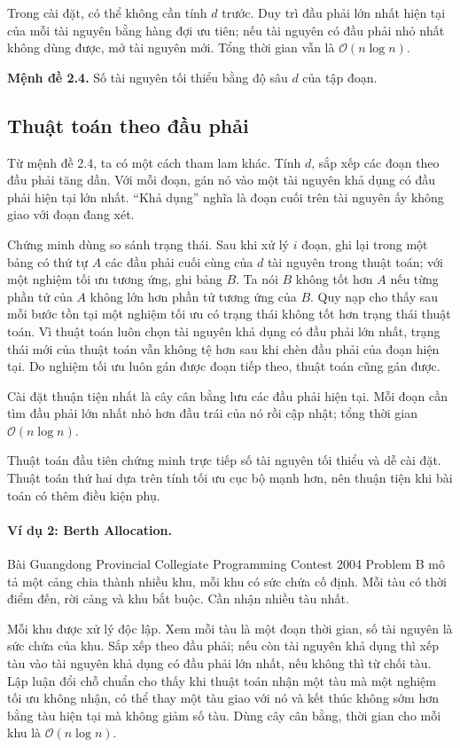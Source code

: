\documentclass[11pt]{article}
\newcommand{\Oh}{\mathcal{O}}
\newcommand{\depth}{d}
\begin{document}
Trong cài đặt, có thể không cần tính \(\depth\) trước. Duy trì đầu phải lớn
nhất hiện tại của mỗi tài nguyên bằng hàng đợi ưu tiên; nếu tài nguyên có đầu
phải nhỏ nhất không dùng được, mở tài nguyên mới. Tổng thời gian vẫn là
\(\Oh(n\log n)\).

\textbf{Mệnh đề 2.4.} Số tài nguyên tối thiểu bằng độ sâu \(\depth\) của tập
đoạn.

\subsection{Thuật toán theo đầu phải}

Từ mệnh đề 2.4, ta có một cách tham lam khác. Tính \(\depth\), sắp xếp các
đoạn theo đầu phải tăng dần. Với mỗi đoạn, gán nó vào một tài nguyên khả dụng
có đầu phải hiện tại lớn nhất. ``Khả dụng'' nghĩa là đoạn cuối trên tài nguyên
ấy không giao với đoạn đang xét.

Chứng minh dùng so sánh trạng thái. Sau khi xử lý \(i\) đoạn, ghi lại trong
một bảng có thứ tự \(A\) các đầu phải cuối cùng của \(\depth\) tài nguyên trong
thuật toán; với một nghiệm tối ưu tương ứng, ghi bảng \(B\). Ta nói \(B\) không
tốt hơn \(A\) nếu từng phần tử của \(A\) không lớn hơn phần tử tương ứng của
\(B\). Quy nạp cho thấy sau mỗi bước tồn tại một nghiệm tối ưu có trạng thái
không tốt hơn trạng thái thuật toán. Vì thuật toán luôn chọn tài nguyên khả
dụng có đầu phải lớn nhất, trạng thái mới của thuật toán vẫn không tệ hơn sau
khi chèn đầu phải của đoạn hiện tại. Do nghiệm tối ưu luôn gán được đoạn tiếp
theo, thuật toán cũng gán được.

Cài đặt thuận tiện nhất là cây cân bằng lưu các đầu phải hiện tại. Mỗi đoạn
cần tìm đầu phải lớn nhất nhỏ hơn đầu trái của nó rồi cập nhật; tổng thời gian
\(\Oh(n\log n)\).

Thuật toán đầu tiên chứng minh trực tiếp số tài nguyên tối thiểu và dễ cài
đặt. Thuật toán thứ hai dựa trên tính tối ưu cục bộ mạnh hơn, nên thuận tiện
khi bài toán có thêm điều kiện phụ.

\paragraph{Ví dụ 2: Berth Allocation.}
Bài Guangdong Provincial Collegiate Programming Contest 2004 Problem B mô tả
một cảng chia thành nhiều khu, mỗi khu có sức chứa cố định. Mỗi tàu có thời
điểm đến, rời cảng và khu bắt buộc. Cần nhận nhiều tàu nhất.

Mỗi khu được xử lý độc lập. Xem mỗi tàu là một đoạn thời gian, số tài nguyên
là sức chứa của khu. Sắp xếp theo đầu phải; nếu còn tài nguyên khả dụng thì
xếp tàu vào tài nguyên khả dụng có đầu phải lớn nhất, nếu không thì từ chối
tàu. Lập luận đổi chỗ chuẩn cho thấy khi thuật toán nhận một tàu mà một nghiệm
tối ưu không nhận, có thể thay một tàu giao với nó và kết thúc không sớm hơn
bằng tàu hiện tại mà không giảm số tàu. Dùng cây cân bằng, thời gian cho mỗi
khu là \(\Oh(n\log n)\).
\end{document}
